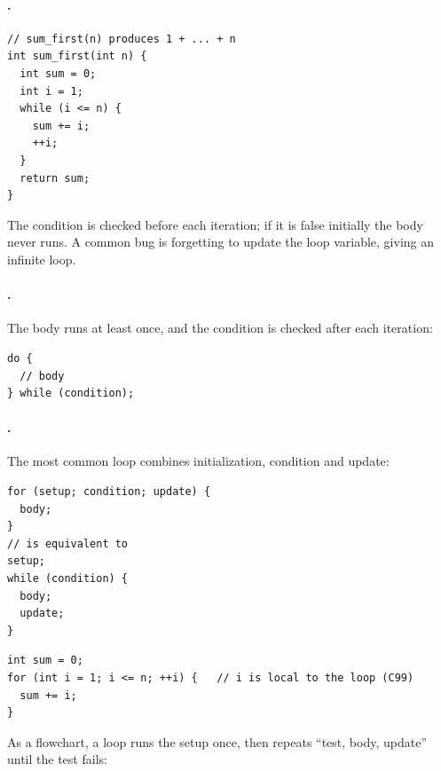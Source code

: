 \paragraph{.}
\begin{lstlisting}[style=c]
// sum_first(n) produces 1 + ... + n
int sum_first(int n) {
  int sum = 0;
  int i = 1;
  while (i <= n) {
    sum += i;
    ++i;
  }
  return sum;
}
\end{lstlisting}
The condition is checked before each iteration; if it is false initially the body never runs.
A common bug is forgetting to update the loop variable, giving an infinite loop.

\paragraph{.} The body runs at least once, and the condition is checked
after each iteration:
\begin{lstlisting}[style=c]
do {
  // body
} while (condition);
\end{lstlisting}

\paragraph{.} The most common loop combines initialization, condition and update:
\begin{lstlisting}[style=c]
for (setup; condition; update) {
  body;
}
// is equivalent to
setup;
while (condition) {
  body;
  update;
}
\end{lstlisting}
\begin{lstlisting}[style=c]
int sum = 0;
for (int i = 1; i <= n; ++i) {   // i is local to the loop (C99)
  sum += i;
}
\end{lstlisting}

As a flowchart, a  loop runs the setup once, then repeats
``test, body, update'' until the test fails:

\begin{center}
\end{center}

